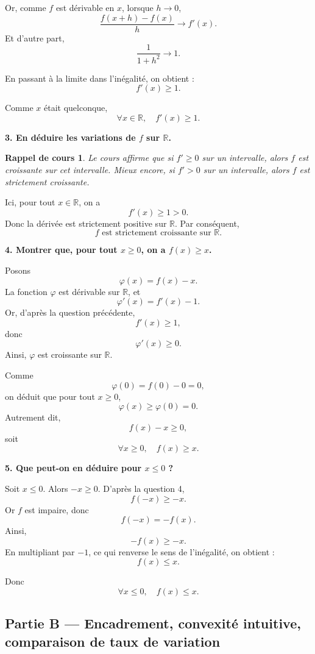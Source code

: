 \documentclass[11pt,a4paper]{article}
\newtheorem*{rappel}{Rappel de cours}
\newcommand{\R}{\mathbb{R}}
\begin{document}
Or, comme \(f\) est dérivable en \(x\), lorsque \(h\to 0\),
\[
\frac{f(x+h)-f(x)}{h}\longrightarrow f'(x).
\]
Et d'autre part,
\[
\frac{1}{1+h^2}\longrightarrow 1.
\]

En passant à la limite dans l'inégalité, on obtient :
\[
f'(x)\ge 1.
\]

Comme \(x\) était quelconque,
\[
\boxed{\forall x\in\R,\quad f'(x)\ge 1.}
\]

\bigskip

\textbf{3. En déduire les variations de \(f\) sur \(\R\).}

\begin{rappel}
Le cours affirme que si \(f'\ge 0\) sur un intervalle, alors \(f\) est croissante sur cet intervalle.
Mieux encore, si \(f'>0\) sur un intervalle, alors \(f\) est strictement croissante.
\end{rappel}

Ici, pour tout \(x\in\R\), on a
\[
f'(x)\ge 1>0.
\]
Donc la dérivée est strictement positive sur \(\R\). Par conséquent,
\[
\boxed{f \text{ est strictement croissante sur } \R.}
\]

\bigskip

\textbf{4. Montrer que, pour tout \(x\ge 0\), on a \(f(x)\ge x\).}

Posons
\[
\varphi(x)=f(x)-x.
\]
La fonction \(\varphi\) est dérivable sur \(\R\), et
\[
\varphi'(x)=f'(x)-1.
\]
Or, d'après la question précédente,
\[
f'(x)\ge 1,
\]
donc
\[
\varphi'(x)\ge 0.
\]
Ainsi, \(\varphi\) est croissante sur \(\R\).

Comme
\[
\varphi(0)=f(0)-0=0,
\]
on déduit que pour tout \(x\ge 0\),
\[
\varphi(x)\ge \varphi(0)=0.
\]
Autrement dit,
\[
f(x)-x\ge 0,
\]
soit
\[
\boxed{\forall x\ge 0,\quad f(x)\ge x.}
\]

\bigskip

\textbf{5. Que peut-on en déduire pour \(x\le 0\) ?}

Soit \(x\le 0\). Alors \(-x\ge 0\). D'après la question 4,
\[
f(-x)\ge -x.
\]
Or \(f\) est impaire, donc
\[
f(-x)=-f(x).
\]
Ainsi,
\[
-f(x)\ge -x.
\]
En multipliant par \(-1\), ce qui renverse le sens de l'inégalité, on obtient :
\[
f(x)\le x.
\]

Donc
\[
\boxed{\forall x\le 0,\quad f(x)\le x.}
\]

\bigskip

\subsection*{Partie B --- Encadrement, convexité intuitive, comparaison de taux de variation}
\end{document}
